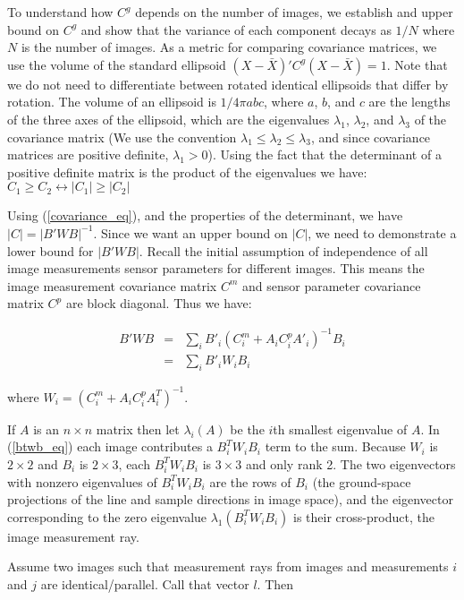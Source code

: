\documentclass[10pt]{amsart}
\newcommand{\btwbi}{B^T_iW_iB_i}
\begin{document}
To understand how $C^g$ depends on the number of images, we establish and upper
bound on $C^g$ and show that the variance of each component decays as $1/N$
where $N$ is the number of images.  As a metric for comparing covariance
matrices, we use the volume of the standard ellipsoid $(X - \bar{X})'C^g(X -
\bar{X}) = 1$.  Note that we do not need to differentiate between rotated identical
ellipsoids that differ by rotation.  The volume of an ellipsoid is $1/4 \pi abc$, 
where $a$, $b$, and $c$ are the lengths of the three axes of the ellipsoid, which 
are the eigenvalues $\lambda_1$, $\lambda_2$, and $\lambda_3$ of the covariance matrix
(We use the convention $\lambda_1 \le \lambda_2 \le \lambda_3$, and
since covariance matrices are positive definite, $\lambda_1 > 0$).  Using
the fact that the determinant of a positive definite matrix is the product of
the eigenvalues we have: $C_1 \ge C_2 \leftrightarrow |C_1| \ge |C_2|$

Using (\ref{covariance_eq}), and the properties of the determinant, we have $|C|
= |B'WB|^{-1}$. Since we want an upper bound on $|C|$, we need to demonstrate a
lower bound for $|B'WB|$. Recall the initial assumption of independence of all
image measurements sensor parameters for different images.  This means the image
measurement covariance matrix $C^m$ and sensor parameter covariance matrix $C^p$
are block diagonal. Thus we have:

\begin{eqnarray}\label{btwb_eq}
B'WB & = & \sum_{i}B'_i(C^m_i + A_iC^p_iA'_i)^{-1}B_i \nonumber \\
     & = & \sum_{i}B'_iW_iB_i
\end{eqnarray}

where $W_i = (C^m_i + A_iC^p_iA^T_i)^{-1}$.

If $A$ is an $n\times n$ matrix then let $\lambda_i(A)$ be the $i$th smallest
eigenvalue of $A$.  In (\ref{btwb_eq}) each image contributes a $\btwbi$ term to
the sum. Because $W_i$ is $2\times 2$ and $B_i$ is $2\times 3$, each $\btwbi$ is
$3\times 3$ and only rank 2. The two eigenvectors with nonzero eigenvalues of $\btwbi$ are the
rows of $B_i$ (the ground-space projections of the line and sample directions in
image space), and the eigenvector corresponding to the zero eigenvalue $\lambda_1(\btwbi)$ is their
cross-product, the image measurement ray.

Assume two images such that measurement rays from images and measurements
$i$ and $j$ are identical/parallel. Call that vector $l$. Then 
\end{document}
